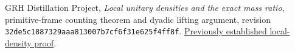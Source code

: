 GRH Distillation Project, \emph{Local unitary densities and the exact
mass ratio}, primitive-frame counting theorem and dyadic lifting
argument, revision \texttt{32de5c1887329aaa813007b7cf6f31e625f4ff8f}.
\href{https://github.com/JoseBrox/GRH_distillation/blob/32de5c1887329aaa813007b7cf6f31e625f4ff8f/paper/sections/recovered/70-md-section.tex}{Previously established local-density proof}.
